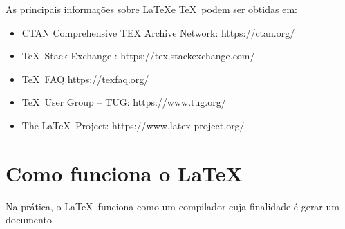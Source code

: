     
As principais informações sobre \LaTeX e \TeX\  podem ser obtidas em:
    \begin{itemize}
    \item CTAN Comprehensive TEX Archive Network: https://ctan.org/
    \item \TeX\ Stack Exchange :  https://tex.stackexchange.com/
    \item \TeX\ FAQ https://texfaq.org/
    \item \TeX\ User Group – TUG: https://www.tug.org/
    \item The \LaTeX\ Project: https://www.latex-project.org/
\end{itemize}


\section{Como funciona o \LaTeX}

Na prática, o \LaTeX\ funciona como um compilador cuja finalidade é gerar um documento 
